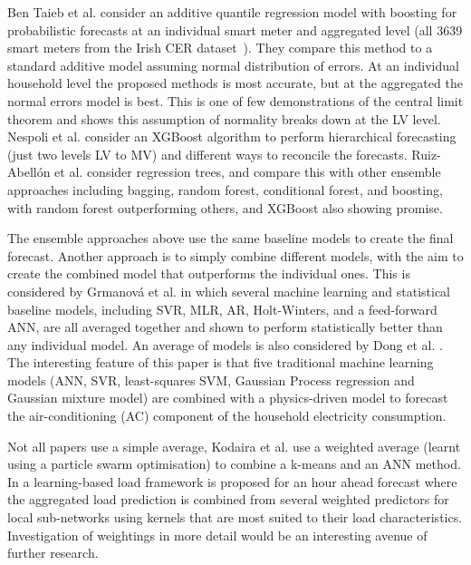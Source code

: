 Ben Taieb et al. \cite{taieb2016fui} consider an additive quantile regression model with boosting for probabilistic forecasts at an individual smart meter and aggregated level (all 3639 smart meters from the Irish CER dataset~\cite{Commission2012csm}). They compare this method to a standard additive model assuming normal distribution of errors. At an individual household level the proposed methods is most accurate, but at the aggregated the normal errors model is best. This is one of few demonstrations of the central limit theorem and shows this assumption of normality breaks down at the LV level. Nespoli et al. \cite{nespoli2020hdf} consider an XGBoost algorithm to perform hierarchical forecasting (just two levels LV to MV) and different ways to reconcile the forecasts. Ruiz-Abellón et al. \cite{ruiz-abellon2018lff} consider regression trees, and compare this with other ensemble approaches including bagging, random forest, conditional forest, and boosting, with random forest outperforming others, and XGBoost also showing promise. 

The ensemble approaches above use the same baseline models to create the final forecast. Another approach is to simply combine different models, with the aim to create the combined model that outperforms the individual ones. This is considered by Grmanová et al. \cite{grmanova2016iel} in which several machine learning and statistical baseline models, including SVR, MLR, AR, Holt-Winters, and a feed-forward ANN, are all averaged together and shown to perform statistically better than any individual model. An average of models is also considered by Dong et al. \cite{dong2016ahm}. The interesting feature of this paper is that five traditional machine learning models (ANN, SVR, least-squares SVM, Gaussian Process regression and Gaussian mixture model) are combined with a physics-driven model to forecast the air-conditioning (AC) component of the household electricity consumption. 

Not all papers use a simple average, Kodaira et al. \cite{kodaira2020oes} use a weighted average (learnt using a particle swarm optimisation) to combine a k-means and an ANN method. In \cite{tajer2017lfv} a learning-based load framework is proposed for an hour ahead forecast where the aggregated load prediction is combined from several weighted predictors for local sub-networks using kernels that are most suited to their load characteristics. Investigation of weightings in more detail would be an interesting avenue of further research. 

